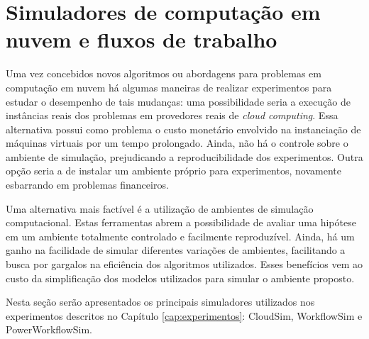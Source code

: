 %


\section{Simuladores de computação em nuvem e fluxos de trabalho}
\label{sec:ambiente_simulacao}
Uma vez concebidos novos algoritmos ou abordagens para problemas em computação
em nuvem há algumas maneiras de realizar experimentos para estudar o desempenho
de tais mudanças: uma possibilidade seria a execução de instâncias
reais dos problemas em provedores reais de \emph{cloud computing}. Essa alternativa
possui como problema o custo monetário envolvido na instanciação de máquinas
virtuais por um tempo prolongado. Ainda, não há o controle sobre o ambiente 
de simulação, prejudicando a reproducibilidade dos experimentos. Outra opção
seria a de instalar um ambiente próprio para experimentos, novamente esbarrando
em problemas financeiros. 

Uma alternativa mais factível é a utilização de ambientes de simulação computacional.
Estas ferramentas abrem a possibilidade de avaliar uma hipótese em um ambiente
totalmente controlado e facilmente reproduzível. Ainda, há um ganho na facilidade
de simular diferentes variações de ambientes, facilitando a busca por gargalos
na eficiência dos algoritmos utilizados. Esses benefícios vem ao custo da
simplificação dos modelos utilizados para simular o ambiente proposto.

Nesta seção serão apresentados os principais simuladores utilizados nos 
experimentos descritos no Capítulo \ref{cap:experimentos}: CloudSim, WorkflowSim
e PowerWorkflowSim.

